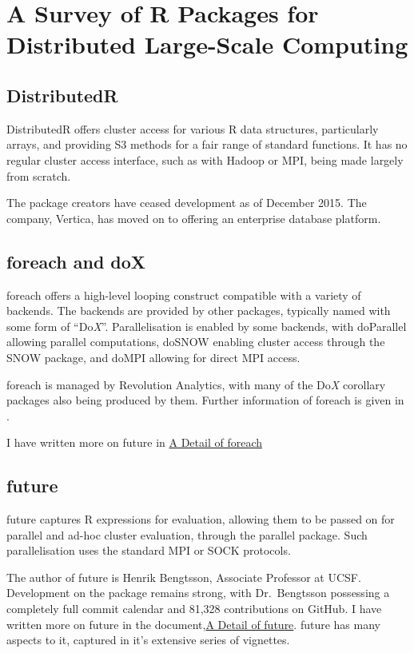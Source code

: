 \documentclass[a4paper,10pt]{article}
\begin{document}
\section{A Survey of R Packages for Distributed Large-Scale Computing}

\subsection{DistributedR}
\label{sec:distributedr}
DistributedR offers cluster access for various R data structures,
particularly arrays, and providing S3 methods for a fair range of
standard functions. It has no regular cluster access interface, such
as with Hadoop or MPI, being made largely from scratch.

The package creators have ceased development as of December 2015. The
company, Vertica, has moved on to offering an enterprise database
platform\cite{vertica:_distr}.

\subsection{foreach and doX}
\label{sec:foreach-dox}

foreach offers a high-level looping construct compatible with a
variety of backends\cite{microsoft20}. The backends are provided by
other packages, typically named with some form of ``Do\textit{X}''.
Parallelisation is enabled by some backends, with doParallel allowing
parallel computations\cite{corporation19}, doSNOW enabling cluster
access through the SNOW package\cite{dosnow19}, and doMPI allowing for
direct MPI access\cite{weston17}.

foreach is managed by Revolution Analytics, with many of the
Do\textit{X} corollary packages also being produced by them. Further
information of foreach is given in \textcite{weston19:_using}.

I have written more on future in \href{detail-foreach.pdf}{A Detail of foreach}

\subsection{future}
\label{sec:future-furrr}

future captures R expressions for evaluation, allowing them to be
passed on for parallel and ad-hoc cluster evaluation, through the
parallel package\cite{bengtsson20}. Such parallelisation uses the
standard MPI or SOCK protocols.

The author of future is Henrik Bengtsson, Associate Professor at UCSF.
Development on the package remains strong, with Dr.~Bengtsson
possessing a completely full commit calendar and 81,328 contributions
on GitHub. I have written more on future in the
document,\href{detail-future.pdf}{A Detail of future}. future has many
aspects to it, captured in it's extensive series of
vignettes\cite{bengtsson20:_futur_r}\cite{bengtsson20:_futur_r2}\cite{bengtsson20:_futur_r3}\cite{bengtsson20:_futur_r4}\cite{bengtsson20:_futur_r5}\cite{bengtsson20:_futur_r6}.
\end{document}
